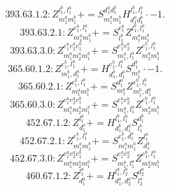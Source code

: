 \documentclass[letterpaper,10pt,fleqn,leqno,onecolumn]{article}
\begin{document}
\begin{equation} \;\;\;\;\;\;  393.63.1.2: Z^{l_{1}^{b},l_{1}^{a}}_{m_{1}^{a}m_{1}^{b}}+=S^{d_{1}^{a}d_{1}^{b}}_{m_{1}^{a}m_{1}^{b}}H^{l_{1}^{b},l_{1}^{a}}_{d_{1}^{a}d_{1}^{b}}\cdot -1. \end{equation}
\begin{equation} \;\;\;\;\;\;  393.63.2.1: Z^{e_{1}^{b},l_{1}^{a}}_{m_{1}^{a}m_{1}^{b}}+=S^{e_{1}^{b}}_{l_{1}^{b}}Z^{l_{1}^{b},l_{1}^{a}}_{m_{1}^{a}m_{1}^{b}} \end{equation}
\begin{equation} \;\;\;\;\;\;  393.63.3.0: Z^{e_{1}^{a}e_{2}^{a}e_{1}^{b}}_{m_{1}^{a}m_{2}^{a}m_{1}^{b}}+=S^{e_{1}^{a}e_{2}^{a}}_{m_{1}^{a},l_{1}^{a}}Z^{e_{1}^{b},l_{1}^{a}}_{m_{2}^{a}m_{1}^{b}} \end{equation}
\begin{equation} \;\;\;\;\;\;  365.60.1.2: Z^{e_{1}^{b},l_{1}^{a}}_{m_{1}^{b},d_{1}^{a}}+=H^{e_{1}^{b},l_{1}^{a}}_{d_{1}^{b},d_{1}^{a}}S^{d_{1}^{b}}_{m_{1}^{b}}\cdot -1. \end{equation}
\begin{equation} \;\;\;\;\;\;  365.60.2.1: Z^{e_{1}^{b},l_{1}^{a}}_{m_{1}^{a}m_{1}^{b}}+=S^{d_{1}^{a}}_{m_{1}^{a}}Z^{e_{1}^{b},l_{1}^{a}}_{m_{1}^{b},d_{1}^{a}} \end{equation}
\begin{equation} \;\;\;\;\;\;  365.60.3.0: Z^{e_{1}^{a}e_{2}^{a}e_{1}^{b}}_{m_{1}^{a}m_{2}^{a}m_{1}^{b}}+=S^{e_{1}^{a}e_{2}^{a}}_{m_{1}^{a},l_{1}^{a}}Z^{e_{1}^{b},l_{1}^{a}}_{m_{2}^{a}m_{1}^{b}} \end{equation}
\begin{equation} \;\;\;\;\;\;  452.67.1.2: Z^{l_{1}^{a}}_{d_{1}^{a}}+=H^{l_{1}^{b},l_{1}^{a}}_{d_{1}^{b},d_{1}^{a}}S^{d_{1}^{b}}_{l_{1}^{b}} \end{equation}
\begin{equation} \;\;\;\;\;\;  452.67.2.1: Z^{e_{1}^{b},l_{1}^{a}}_{m_{1}^{a}m_{1}^{b}}+=S^{e_{1}^{b},d_{1}^{a}}_{m_{1}^{a}m_{1}^{b}}Z^{l_{1}^{a}}_{d_{1}^{a}} \end{equation}
\begin{equation} \;\;\;\;\;\;  452.67.3.0: Z^{e_{1}^{a}e_{2}^{a}e_{1}^{b}}_{m_{1}^{a}m_{2}^{a}m_{1}^{b}}+=S^{e_{1}^{a}e_{2}^{a}}_{m_{1}^{a},l_{1}^{a}}Z^{e_{1}^{b},l_{1}^{a}}_{m_{2}^{a}m_{1}^{b}} \end{equation}
\begin{equation} \;\;\;\;\;\;  460.67.1.2: Z^{l_{1}^{a}}_{d_{1}^{a}}+=H^{l_{1}^{a},l_{2}^{a}}_{d_{1}^{a},d_{2}^{a}}S^{d_{2}^{a}}_{l_{2}^{a}} \end{equation}
\end{document}

